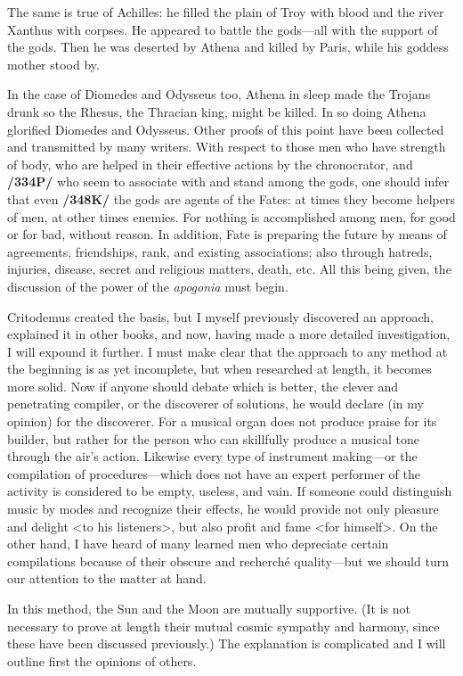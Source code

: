 The same is true of Achilles: he filled the plain of Troy with blood and the river Xanthus with corpses. He appeared to battle the gods—all with the support of the gods. Then he was deserted by Athena and killed by Paris, while his goddess mother stood by. 

In the case of Diomedes and Odysseus too, Athena in sleep made the Trojans drunk so the Rhesus, the Thracian king, might be killed. In so doing Athena glorified Diomedes and Odysseus. Other proofs of this point have been collected and transmitted by many writers. With respect to those men who have strength of body, who are helped in their effective actions by the chronocrator, and \textbf{/334P/} who seem to associate with and stand among the gods, one should infer that even \textbf{/348K/} the gods are agents of the Fates: at times they become helpers of men, at other times enemies. For nothing is accomplished among men, for good or for bad, without reason. In addition, Fate is preparing the future by means of agreements, friendships, rank, and existing associations; also through hatreds, injuries, disease, secret and religious matters, death, etc. All this being given, the discussion of the power of the \textit{apogonia} must begin. 

Critodemus created the basis, but I myself previously discovered an approach, explained it in other books, and now, having made a more detailed investigation, I will expound it further. I must make clear that the approach to any method at the beginning is as yet incomplete, but when researched at length, it becomes more solid. Now if anyone should debate which is better, the clever and penetrating compiler, or the discoverer of solutions, he would declare (in my opinion) for the discoverer. For a musical organ does not produce praise for its builder, but rather for the person who can skillfully produce a musical tone through the air’s action. Likewise every type of instrument making—or the compilation of procedures—which does not have an expert performer of the activity is considered to be empty, useless, and vain. If someone could distinguish music by modes and recognize their effects, he would provide not only pleasure and delight <to his listeners>, but also profit and fame <for himself>. On the other hand, I have heard of many learned men who depreciate certain compilations because of their obscure and recherché quality—but we should turn our attention to the matter at hand.

In this method, the Sun and the Moon are mutually supportive. (It is not necessary to prove at length their mutual cosmic sympathy and harmony, since these have been discussed previously.) The explanation
is complicated and I will outline first the opinions of others. 

